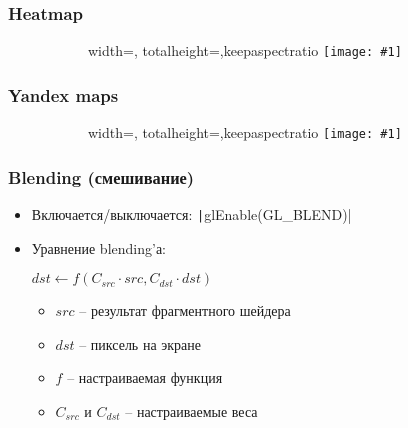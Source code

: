 \documentclass[10pt]{beamer}
\newcommand{\slideimage}[1]{
  \begin{figure}
    \begin{adjustbox}{width=\textwidth, totalheight=\textheight-2\baselineskip-2\baselineskip,keepaspectratio}
      \texttt{[image: \#1]}
    \end{adjustbox}
  \end{figure}
}
\begin{document}

\begin{frame}
\frametitle{Heatmap}
\begin{figure}
\slideimage{heatmap.jpg}
\end{figure}
\end{frame}


\begin{frame}
\frametitle{Yandex maps}
\begin{figure}
\slideimage{yandex-maps.jpg}
\end{figure}
\end{frame}


\begin{frame}[fragile]
\frametitle{Blending (смешивание)}
\begin{itemize}
\item Включается/выключается: \texttt|glEnable(GL_BLEND)|
\pause
\item Уравнение blending'а:
\begin{center}
\begin{math}
dst \leftarrow f(C_{src} \cdot src, C_{dst} \cdot dst)
\end{math}
\end{center}
\pause
\begin{itemize}
\item \begin{math}src\end{math} -- результат фрагментного шейдера
\pause
\item \begin{math}dst\end{math} -- пиксель на экране
\pause
\item \begin{math}f\end{math} -- настраиваемая функция
\pause
\item \begin{math}C_{src}\end{math} и \begin{math}C_{dst}\end{math} -- настраиваемые веса
\end{itemize}
\end{itemize}
\end{frame}
\end{document}
